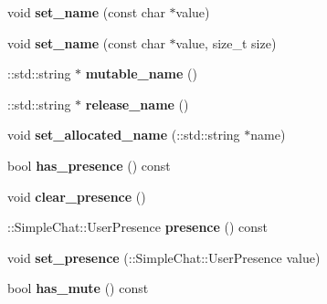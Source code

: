 \begin{DoxyCompactItemize}
\item 
\hypertarget{classSimpleChat_1_1User_af35ec09383b0f6d08c9e7b3504e390e0}{void {\bfseries set\-\_\-name} (const char $\ast$value)}\label{classSimpleChat_1_1User_af35ec09383b0f6d08c9e7b3504e390e0}

\item 
\hypertarget{classSimpleChat_1_1User_a1359df9c2b899976cf1009decfece340}{void {\bfseries set\-\_\-name} (const char $\ast$value, size\-\_\-t size)}\label{classSimpleChat_1_1User_a1359df9c2b899976cf1009decfece340}

\item 
\hypertarget{classSimpleChat_1_1User_a742405a8109ee29dffcf727033cdb663}{\-::std\-::string $\ast$ {\bfseries mutable\-\_\-name} ()}\label{classSimpleChat_1_1User_a742405a8109ee29dffcf727033cdb663}

\item 
\hypertarget{classSimpleChat_1_1User_a448d43306fd147672063875ab30a12ee}{\-::std\-::string $\ast$ {\bfseries release\-\_\-name} ()}\label{classSimpleChat_1_1User_a448d43306fd147672063875ab30a12ee}

\item 
\hypertarget{classSimpleChat_1_1User_a9d4774e5abe7bba7e01065344cb94ab5}{void {\bfseries set\-\_\-allocated\-\_\-name} (\-::std\-::string $\ast$name)}\label{classSimpleChat_1_1User_a9d4774e5abe7bba7e01065344cb94ab5}

\item 
\hypertarget{classSimpleChat_1_1User_a3696c71b8ac996eba4e1ed2cfc5128f4}{bool {\bfseries has\-\_\-presence} () const }\label{classSimpleChat_1_1User_a3696c71b8ac996eba4e1ed2cfc5128f4}

\item 
\hypertarget{classSimpleChat_1_1User_af810ab7c99299a594cd01ea507691835}{void {\bfseries clear\-\_\-presence} ()}\label{classSimpleChat_1_1User_af810ab7c99299a594cd01ea507691835}

\item 
\hypertarget{classSimpleChat_1_1User_a4310d4da92fee0889e90e5939e59dd4a}{\-::Simple\-Chat\-::\-User\-Presence {\bfseries presence} () const }\label{classSimpleChat_1_1User_a4310d4da92fee0889e90e5939e59dd4a}

\item 
\hypertarget{classSimpleChat_1_1User_abce18e8edb234ff2720525d9648377f1}{void {\bfseries set\-\_\-presence} (\-::Simple\-Chat\-::\-User\-Presence value)}\label{classSimpleChat_1_1User_abce18e8edb234ff2720525d9648377f1}

\item 
\hypertarget{classSimpleChat_1_1User_ac9ba533a79223fc1c8115d3464cc8e5e}{bool {\bfseries has\-\_\-mute} () const }\label{classSimpleChat_1_1User_ac9ba533a79223fc1c8115d3464cc8e5e}


\end{DoxyCompactItemize}
